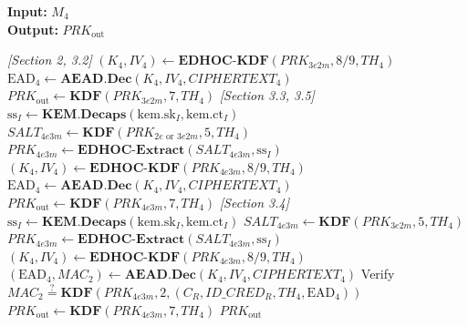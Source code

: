\documentclass{easychair}
\begin{document}
\begin{algorithm}[H]
\caption{Step 5 (Initiator) --- Process $M_4$ (optional for Sections~2 and~3.2; mandatory otherwise)}
\label{alg:step5}
\textbf{Input:} $M_4$ \\
\textbf{Output:} $PRK_{\mathrm{out}}$
\begin{algorithmic}[1]
\Statex \textit{[Section 2, 3.2]} 
\State $(K_4, IV_4) \gets \mathbf{EDHOC\text{-}KDF}(PRK_{3e2m}, 8\text{/}9, TH_4)$
\State $\mathrm{EAD}_4 \gets \mathbf{AEAD.Dec}(K_4, IV_4, CIPHERTEXT_4)$
\State $PRK_{\mathrm{out}} \gets \mathbf{KDF}(PRK_{3e2m}, 7, TH_4)$
\Statex \textit{[Section 3.3, 3.5]} 
\State $\mathrm{ss}_I \gets \mathbf{KEM.Decaps}(\mathrm{kem.sk}_I, \mathrm{kem.ct}_I)$
\State $SALT_{4e3m} \gets \mathbf{KDF}(PRK_{2e\text{ or }3e2m}, 5, TH_4)$ 
\State $PRK_{4e3m} \gets \mathbf{EDHOC\text{-}Extract}(SALT_{4e3m}, \mathrm{ss}_I)$
\State $(K_4, IV_4) \gets \mathbf{EDHOC\text{-}KDF}(PRK_{4e3m}, 8\text{/}9, TH_4)$
\State $\mathrm{EAD}_4 \gets \mathbf{AEAD.Dec}(K_4, IV_4, CIPHERTEXT_4)$
\State $PRK_{\mathrm{out}} \gets \mathbf{KDF}(PRK_{4e3m}, 7, TH_4)$
\Statex \textit{[Section 3.4]} 
\State $\mathrm{ss}_I \gets \mathbf{KEM.Decaps}(\mathrm{kem.sk}_I, \mathrm{kem.ct}_I)$
\State $SALT_{4e3m} \gets \mathbf{KDF}(PRK_{3e2m}, 5, TH_4)$
\State $PRK_{4e3m} \gets \mathbf{EDHOC\text{-}Extract}(SALT_{4e3m}, \mathrm{ss}_I)$
\State $(K_4, IV_4) \gets \mathbf{EDHOC\text{-}KDF}(PRK_{4e3m}, 8\text{/}9, TH_4)$
\State $(\mathrm{EAD}_4, MAC_2) \gets \mathbf{AEAD.Dec}(K_4, IV_4, CIPHERTEXT_4)$
\State Verify $MAC_2 \stackrel{?}{=} \mathbf{KDF}(PRK_{4e3m}, 2, (C_R, ID\_CRED_R, TH_4, \mathrm{EAD}_4))$
\State $PRK_{\mathrm{out}} \gets \mathbf{KDF}(PRK_{4e3m}, 7, TH_4)$
\State \Return $PRK_{\mathrm{out}}$
\end{algorithmic}
\end{algorithm}


\end{document}
